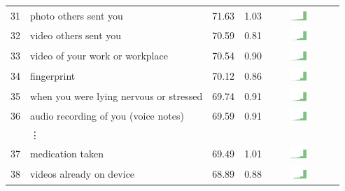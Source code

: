 \begin{table}[t]
\begin{center}
\begin{tabular}{| r | l | r | r | r | r |}
31 & photo others sent you & 71.63 & 1.03 & \includegraphics[width = 2cm, height = 0.5cm]{tex-inputs/table-images/sharedphotosotherssenttoyousavedonyourdevicecombined} \\ 
32 & video others sent you & 70.59 & 0.81 & \includegraphics[width = 2cm, height = 0.5cm]{tex-inputs/table-images/sharedvideosotherssentyousavedonyourdevicecombined} \\ 
33 & video of your work or workplace & 70.54 & 0.90 & \includegraphics[width = 2cm, height = 0.5cm]{tex-inputs/table-images/tookvideosatwork(withanoutward-facingcamera)combined} \\ 
34 & fingerprint & 70.12 & 0.86 & \includegraphics[width = 2cm, height = 0.5cm]{tex-inputs/table-images/learnedyourfingerprintsomehowcombined} \\ 
35 & when you were lying nervous or stressed & 69.74 & 0.91 & \includegraphics[width = 2cm, height = 0.5cm]{tex-inputs/table-images/learnedwhenyouwerelyingnervousorstressedcombined} \\ 
36 & audio recording of you (voice notes) & 69.59 & 0.91 & \includegraphics[width = 2cm, height = 0.5cm]{tex-inputs/table-images/recordedyoutalkingtoyourself(makingvoicenotes)combined} \\ 
& \vdots & & & \\
37 & medication taken & 69.49 & 1.01 & \includegraphics[width = 2cm, height = 0.5cm]{tex-inputs/table-images/learnedwhatmedicationyoutakecombined} \\ 
38 & videos already on device & 68.89 & 0.88 & \includegraphics[width = 2cm, height = 0.5cm]{tex-inputs/table-images/sharedvideosyoutookwhicharealreadyonyourdevicecombined} \\ 

\end{tabular}
\end{center}
\end{table}
